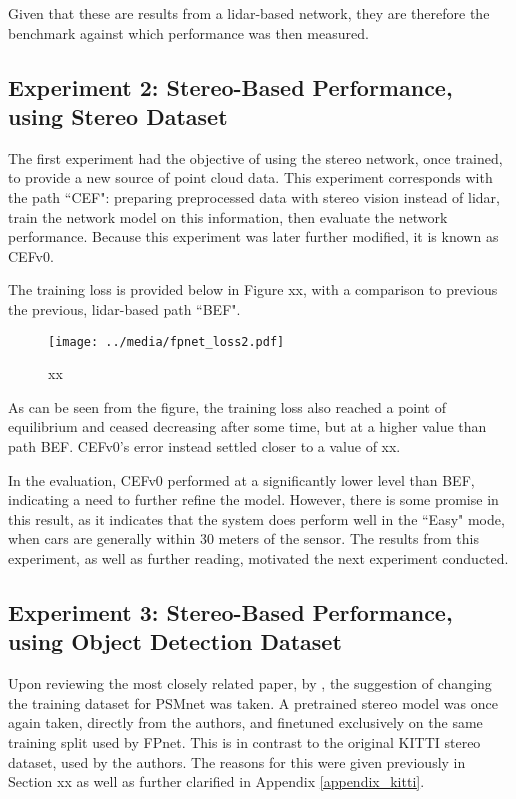 Given that these are results from a lidar-based network, they are therefore the benchmark against which performance was then measured. 

\subsection{Experiment 2: Stereo-Based Performance, using Stereo Dataset}
The first experiment had the objective of using the stereo network, once trained, to provide a new source of point cloud data. This experiment corresponds with the path ``CEF": preparing preprocessed data with stereo vision instead of lidar, train the network model on this information, then evaluate the network performance. Because this experiment was later further modified, it is known as CEFv0. 


The training loss is provided below in Figure xx, with a comparison to previous the previous, lidar-based path ``BEF". 

\begin{figure}[H]
	\centering
	\texttt{[image: ../media/fpnet\_loss2.pdf]}
	\caption{xx}
	\label{fpnet_loss2}
\end{figure}

As can be seen from the figure, the training loss also reached a point of equilibrium and ceased decreasing after some time, but at a higher value than path BEF. CEFv0's error instead settled closer to a value of xx. 

In the evaluation, CEFv0 performed at a significantly lower level than BEF, indicating a need to further refine the model. However, there is some promise in this result, as it indicates that the system does perform well in the ``Easy" mode, when cars are generally within 30 meters of the sensor. The results from this experiment, as well as further reading, motivated the next experiment conducted.

\subsection{Experiment 3: Stereo-Based Performance, using Object Detection Dataset}
Upon reviewing the most closely related paper, by \cite{wang_pseudo-lidar_2019}, the suggestion of changing the training dataset for PSMnet was taken. A pretrained stereo model was once again taken, directly from the authors, and finetuned exclusively on the same training split used by FPnet. This is in contrast to the original KITTI stereo dataset, used by the authors. The reasons for this were given previously in Section xx as well as further clarified in Appendix \ref{appendix_kitti}.

